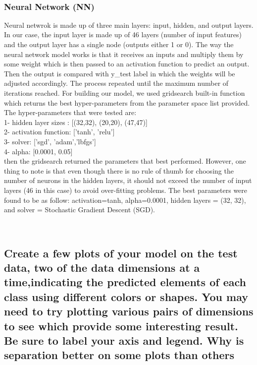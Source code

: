 \\

\subsubsection{Neural Network (NN)}
Neural netwrok is made up of three main layers: input, hidden, and output layers. In our case, the input layer is made up of 46 layers (number of input features) and the output layer has a single node (outputs either 1 or 0). The way the neural network model works is that it receives an inputs and multiply them by some weight which is then passed to an activation function to predict an output. Then the output is compared with y\_test label in which the weights will be adjusted accordingly. The process repeated until the maximum number of iterations reached. For building our model, we used gridsearch built-in function which returns the best hyper-parameters from the parameter space list provided. The hyper-parameters that were tested are:\\
1- hidden layer sizes : [(32,32), (20,20), (47,47)] \\
2- activation function: ['tanh', 'relu'] \\
3- solver: ['sgd', 'adam','lbfgs'] \\
4- alpha: [0.0001, 0.05] \\
then the gridsearch returned the parameters that best performed. However, one thing to note is that even though there is no rule of thumb for choosing the number of neurons in the hidden layers, it should not exceed the number of input layers (46 in this case) to avoid over-fitting problems. 
The best parameters were found to be as follow: activation=tanh, alpha=0.0001, hidden layers = (32, 32), and solver = Stochastic Gradient Descent (SGD). 

\\






\subsection{Create a few plots of your model on the test data, two of the data dimensions at a time,indicating the predicted elements of each class using different colors or shapes. You may need to try plotting various pairs of dimensions to see which provide some interesting result. Be sure to label your axis and legend. Why is separation better on some plots than others}


